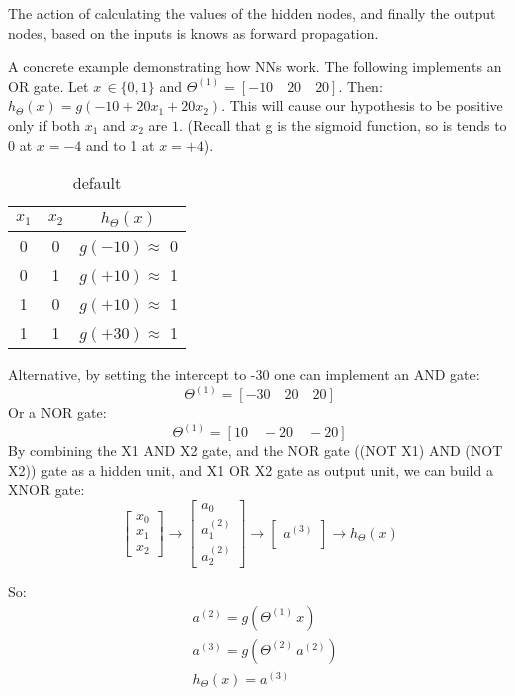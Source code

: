 \documentclass[12pt]{article}
\begin{document}

The action of calculating the values of the hidden nodes, and finally the output nodes, based on the inputs is knows as forward propagation. 

A concrete example demonstrating how NNs work. The following implements an OR gate. Let $x \, \in \{0,1\}$ and $\Theta^{(1)} = [-10\quad 20\quad 20]$. Then: $h_\Theta(x) = g(-10 + 20x_1 + 20x_2)$. This will cause our hypothesis to be positive only if both $x_1$ and $x_2$ are $1$. (Recall that g is the sigmoid function, so is tends to 0 at $x=-4$ and to 1 at $x=+4$).
\begin{table}[htp]
\caption{default}
\begin{center}
\begin{tabular}{c c | c}
$x_1$ & $x_2$ & $h_\Theta(x)$\\
\hline
0 & 0 & $g(-10) \approx $ 0 \\
0 & 1 & $g(+10) \approx $ 1 \\
1 & 0 & $g(+10) \approx $ 1 \\
1 & 1 & $g(+30) \approx $ 1 
\end{tabular}
\end{center}
\label{default}
\end{table}%

Alternative, by setting the intercept to -30 one can implement an AND gate:
\[
\Theta^{(1)} =  [-30\quad 20\quad 20]
\]
Or a NOR gate:
\[
\Theta^{(1)} =  [10\quad -20\quad -20]
\]
By combining the X1 AND X2 gate, and the NOR gate ((NOT X1) AND (NOT X2)) gate as a hidden unit, and X1 OR X2 gate as output unit, we can build a XNOR gate:
\[
\begin{bmatrix}
x_0\\x_1\\x_2
\end{bmatrix}
\rightarrow
\begin{bmatrix}
a_0\\a_1^{(2)}\\a_2^{(2)}
\end{bmatrix}
\rightarrow
\begin{bmatrix}
a^{(3)}\\
\end{bmatrix}
\rightarrow h_\Theta(x)
\]

So:
\begin{align*}
&a^{(2)} = g(\Theta^{(1)}\, x)\\
&a^{(3)} = g(\Theta^{(2)}\, a^{(2)}) \\
&h_\Theta(x) = a^{(3)}
\end{align*}
\end{document}
